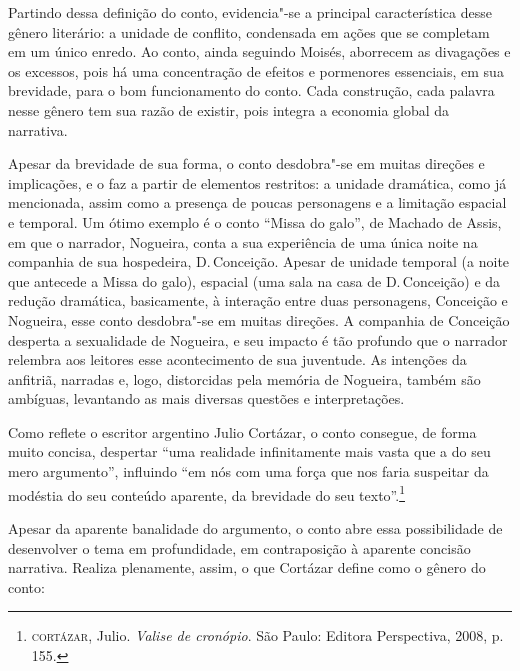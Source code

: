 Partindo dessa definição do conto, evidencia"-se a principal característica desse gênero literário: a unidade de conflito, condensada em ações que se completam em um único enredo. Ao conto, ainda seguindo Moisés, aborrecem as divagações e os excessos, pois há uma concentração de efeitos e pormenores essenciais, em sua brevidade, para o bom funcionamento do conto.
Cada construção, cada palavra nesse gênero tem sua razão de existir, pois integra a economia global da narrativa.

Apesar da brevidade de sua forma, o conto desdobra"-se em muitas direções e implicações, e o faz a partir de elementos restritos: a unidade dramática, como já mencionada, assim como a presença de poucas personagens e a limitação espacial e temporal. Um ótimo exemplo é o conto ``Missa do galo'', de Machado de Assis, em que o narrador, Nogueira, conta a sua experiência de uma única noite na companhia de sua hospedeira, D.\,Conceição. Apesar de unidade temporal (a noite que antecede a Missa do galo), espacial (uma sala na casa de D.\,Conceição) e da redução dramática, basicamente, à interação entre duas personagens, Conceição e Nogueira, esse conto desdobra"-se em muitas direções. A companhia de Conceição desperta a sexualidade de Nogueira, e seu impacto é tão profundo que o narrador relembra aos leitores esse acontecimento de sua juventude. As intenções da anfitriã, narradas e, logo, distorcidas pela memória de Nogueira, também são ambíguas, levantando as mais diversas questões e interpretações.

Como reflete o escritor argentino Julio Cortázar, o conto consegue, de forma muito concisa, despertar ``uma realidade infinitamente mais vasta que a do seu mero argumento'', influindo ``em nós com uma força que nos faria suspeitar da modéstia do seu conteúdo aparente, da brevidade do seu texto''.\footnote{\textsc{cortázar}, Julio. \textit{Valise de cronópio}. São Paulo: Editora Perspectiva, 2008, p.\,155.}

Apesar da aparente banalidade do argumento, o conto abre essa possibilidade de desenvolver o tema em profundidade, em contraposição à aparente concisão narrativa. Realiza plenamente, assim, o que Cortázar define como o gênero do conto:

